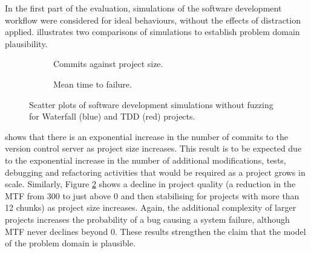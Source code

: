 \documentclass{llncs}
\begin{document}
In the first part of the evaluation, simulations of the software development workflow were considered for ideal
behaviours, without the effects of distraction applied.   illustrates two comparisons of
simulations to establish problem domain plausibility.  %
\begin{figure}[t]
  \centering

  \hfill
  \begin{subfigure}{2.3in}
    \caption{Commits against project size.}
    \label{fig:no-fuzzing:features}
  \end{subfigure}
  \hfill
  \begin{subfigure}{2.3in}
    \caption{Mean time to failure.}  
    \label{fig:no-fuzzing:mtf}
  \end{subfigure}
  \hfill

  \caption{Scatter plots of software development simulations without fuzzing for Waterfall (blue) and TDD (red)
    projects.}
  \label{fig:no-fuzzing}
\end{figure}
shows that there is an exponential increase in the number of commits to the version control server as project size
increases.  This result is to be expected due to the exponential increase in the number of additional modifications,
tests, debugging and refactoring activities that would be required as a project grows in scale.  Similarly, Figure
\ref{fig:no-fuzzing:mtf} shows a decline in project quality (a reduction in the MTF from 300 to just above 0 and then
stabilising for projects with more than 12 chunks) as project size increases.  Again, the additional complexity of
larger projects increases the probability of a bug causing a system failure, although MTF never declines beyond 0.
These results strengthen the claim that the model of the problem domain is plausible.
\end{document}

